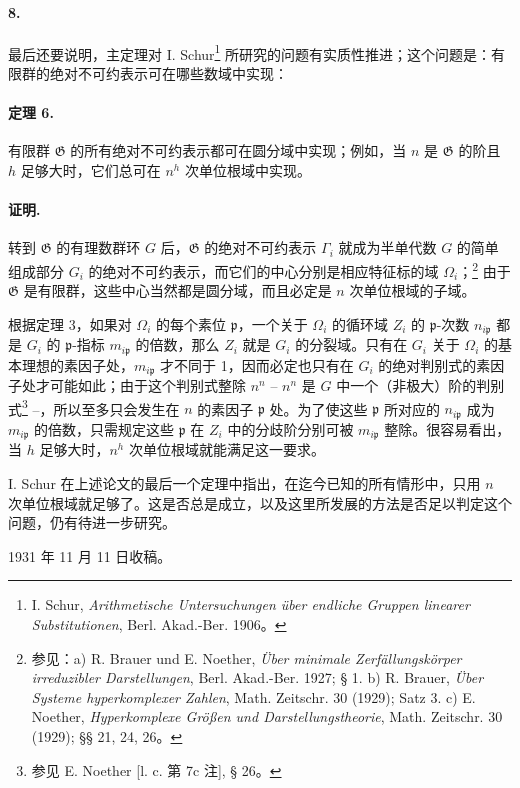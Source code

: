 \documentclass[11pt]{article}
\begin{document}
\paragraph{8.}
最后还要说明，主定理对 I. Schur\footnote{I. Schur, \emph{Arithmetische Untersuchungen über endliche Gruppen linearer Substitutionen}, Berl. Akad.-Ber. 1906。} 所研究的问题有实质性推进；这个问题是：有限群的绝对不可约表示可在哪些数域中实现：

\paragraph{定理 6.}
有限群 \(\mathfrak G\) 的所有绝对不可约表示都可在圆分域中实现；例如，当 \(n\) 是 \(\mathfrak G\) 的阶且 \(h\) 足够大时，它们总可在 \(n^h\) 次单位根域中实现。

\paragraph{证明.}
转到 \(\mathfrak G\) 的有理数群环 \(G\) 后，\(\mathfrak G\) 的绝对不可约表示 \(\Gamma_i\) 就成为半单代数 \(G\) 的简单组成部分 \(G_i\) 的绝对不可约表示，而它们的中心分别是相应特征标的域 \(\Omega_i\)；\footnote{参见：a) R. Brauer und E. Noether, \emph{Über minimale Zerfällungskörper irreduzibler Darstellungen}, Berl. Akad.-Ber. 1927; § 1. b) R. Brauer, \emph{Über Systeme hyperkomplexer Zahlen}, Math. Zeitschr. 30 (1929); Satz 3. c) E. Noether, \emph{Hyperkomplexe Größen und Darstellungstheorie}, Math. Zeitschr. 30 (1929); §§ 21, 24, 26。} 由于 \(\mathfrak G\) 是有限群，这些中心当然都是圆分域，而且必定是 \(n\) 次单位根域的子域。

根据定理 3，如果对 \(\Omega_i\) 的每个素位 \(\mathfrak p\)，一个关于 \(\Omega_i\) 的循环域 \(Z_i\) 的 \(\mathfrak p\)-次数 \(n_{i\mathfrak p}\) 都是 \(G_i\) 的 \(\mathfrak p\)-指标 \(m_{i\mathfrak p}\) 的倍数，那么 \(Z_i\) 就是 \(G_i\) 的分裂域。只有在 \(G_i\) 关于 \(\Omega_i\) 的基本理想的素因子处，\(m_{i\mathfrak p}\) 才不同于 1，因而必定也只有在 \(G_i\) 的绝对判别式的素因子处才可能如此；由于这个判别式整除 \(n^n\) -- \(n^n\) 是 \(G\) 中一个（非极大）阶的判别式\footnote{参见 E. Noether [l. c. 第 7c 注], § 26。} --，所以至多只会发生在 \(n\) 的素因子 \(\mathfrak p\) 处。为了使这些 \(\mathfrak p\) 所对应的 \(n_{i\mathfrak p}\) 成为 \(m_{i\mathfrak p}\) 的倍数，只需规定这些 \(\mathfrak p\) 在 \(Z_i\) 中的分歧阶分别可被 \(m_{i\mathfrak p}\) 整除。很容易看出，当 \(h\) 足够大时，\(n^h\) 次单位根域就能满足这一要求。

I. Schur 在上述论文的最后一个定理中指出，在迄今已知的所有情形中，只用 \(n\) 次单位根域就足够了。这是否总是成立，以及这里所发展的方法是否足以判定这个问题，仍有待进一步研究。

\begin{center}
1931 年 11 月 11 日收稿。
\end{center}

\clearpage

\setcounter{footnote}{0}
\end{document}
